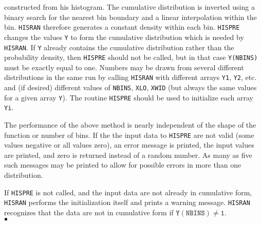 constructed from his histogram. The cumulative distribution is
inverted using a binary search for the nearest bin boundary and a
linear interpolation within the bin. {\tt HISRAN} therefore generates a
constant density within each bin.
\Notes
{\tt HISPRE} changes the values {\tt Y} to form the cumulative
distribution which is needed by {\tt HISRAN}. If {\tt Y} already
contains the cumulative distribution rather than the probability
density, then {\tt HISPRE} should not be called, but in that case
{\tt Y(NBINS)} must be exactly equal to one. Numbers may be drawn from
several different distributions in the same run by calling {\tt HISRAN}
with different arrays {\tt Y1}, {\tt Y2}, etc. and (if desired)
different values of {\tt NBINS},
{\tt XLO}, {\tt XWID} (but always the same values for a given array
{\tt Y}). The routine {\tt  HISPRE} should be used to initialize each
array {\tt Yi}.
\par
The performance of the above method is nearly independent of the shape
of the function or number of bins.
\Errorh
If the the input data to {\tt HISPRE} are not valid (some values
negative or all values zero), an error message is printed, the input
values are printed, and zero is returned instead of a random number.
As many as five such messages may be printed to allow for possible
errors in more than one distribution.
\par
If {\tt HISPRE} is not called, and the input data are not already in
cumulative form, {\tt HISRAN} performs the initialization itself and
prints a warning message. {\tt HISRAN} recognizes that the data are not
in cumulative form if $\mathtt{Y(NBINS) \neq 1}$.
\\ $\bullet$
